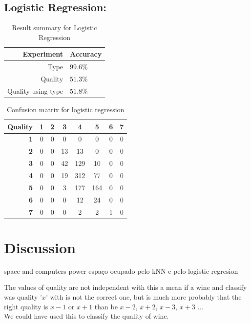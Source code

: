 \documentclass[twoside]{article}
\begin{document}
\begin{multicols}{2}
\subsection*{\textbf{Logistic Regression:}}
\begin{table}[H]
\caption{Result summary for Logistic Regression}
\centering
\begin{tabular}{r|l}
\textbf{Experiment} & \textbf{Accuracy}\\
\midrule
Type & $99.6\%$\\
Quality & $51.3\%$\\
Quality using type & $51.8\%$\\
\end{tabular}
\end{table}


\begin{table}[H]
\caption{Confusion matrix for logistic regression}
\centering
\begin{tabular}{r||c|c|c|c|c|c|c}
\textbf{Quality} & \textbf{1} & \textbf{2} & \textbf{3} & \textbf{4} & \textbf{5} & \textbf{6} & \textbf{7}\\
\hline \hline
\textbf{1} & 0 & 0 & 0 & 0 & 0 & 0 & 0\\
\hline
\textbf{2} & 0 & 0 & 13 & 13 & 0 & 0 & 0\\
\hline
\textbf{3} & 0 & 0 & 42 & 129 & 10 & 0 & 0\\
\hline
\textbf{4} & 0 & 0 & 19 & 312 & 77 & 0 & 0\\
\hline
\textbf{5} & 0 & 0 & 3 & 177 & 164 & 0 & 0\\
\hline
\textbf{6} & 0 & 0 & 0 & 12 & 24 & 0 & 0\\
\hline
\textbf{7} & 0 & 0 & 0 & 2 & 2 & 1 & 0\\
\end{tabular}
\end{table}



\section{Discussion}

space and computers power
espaço ocupado pelo kNN e pelo logistic regresion

The values of quality are not independent with this a mean if a wine and classify was quality '$x$' with is not the correct one, but is much more probably that the right quality is $x-1$ or $x+1$ than be $x-2$, $x+2$, $x-3$, $x+3$ ... \\
We could have used this to classify the quality of wine.



\end{multicols}
\end{document}
